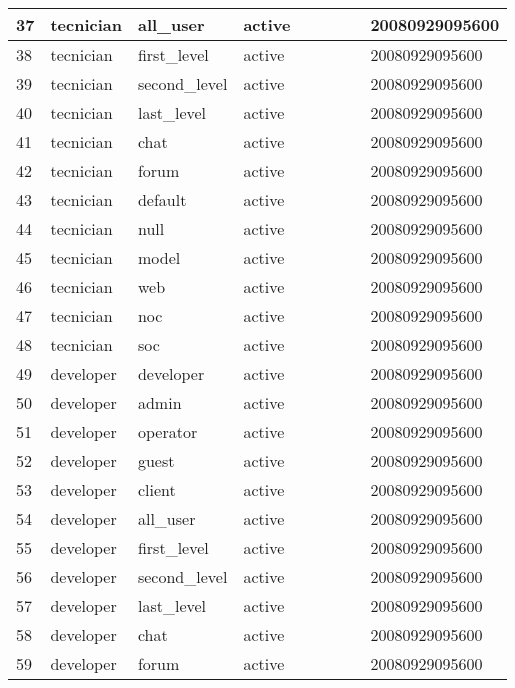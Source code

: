 \begin{longtable}{|l|l|l|l|l|l|l|l|l|}
37 & tecnician & all\_user & active &  &  &  &  & 20080929095600 \\ \hline 
38 & tecnician & first\_level & active &  &  &  &  & 20080929095600 \\ \hline 
39 & tecnician & second\_level & active &  &  &  &  & 20080929095600 \\ \hline 
40 & tecnician & last\_level & active &  &  &  &  & 20080929095600 \\ \hline 
41 & tecnician & chat & active &  &  &  &  & 20080929095600 \\ \hline 
42 & tecnician & forum & active &  &  &  &  & 20080929095600 \\ \hline 
43 & tecnician & default & active &  &  &  &  & 20080929095600 \\ \hline 
44 & tecnician & null & active &  &  &  &  & 20080929095600 \\ \hline 
45 & tecnician & model & active &  &  &  &  & 20080929095600 \\ \hline 
46 & tecnician & web & active &  &  &  &  & 20080929095600 \\ \hline 
47 & tecnician & noc & active &  &  &  &  & 20080929095600 \\ \hline 
48 & tecnician & soc & active &  &  &  &  & 20080929095600 \\ \hline 
49 & developer & developer & active &  &  &  &  & 20080929095600 \\ \hline 
50 & developer & admin & active &  &  &  &  & 20080929095600 \\ \hline 
51 & developer & operator & active &  &  &  &  & 20080929095600 \\ \hline 
52 & developer & guest & active &  &  &  &  & 20080929095600 \\ \hline 
53 & developer & client & active &  &  &  &  & 20080929095600 \\ \hline 
54 & developer & all\_user & active &  &  &  &  & 20080929095600 \\ \hline 
55 & developer & first\_level & active &  &  &  &  & 20080929095600 \\ \hline 
56 & developer & second\_level & active &  &  &  &  & 20080929095600 \\ \hline 
57 & developer & last\_level & active &  &  &  &  & 20080929095600 \\ \hline 
58 & developer & chat & active &  &  &  &  & 20080929095600 \\ \hline 
59 & developer & forum & active &  &  &  &  & 20080929095600 \\ \hline 

\end{longtable}
